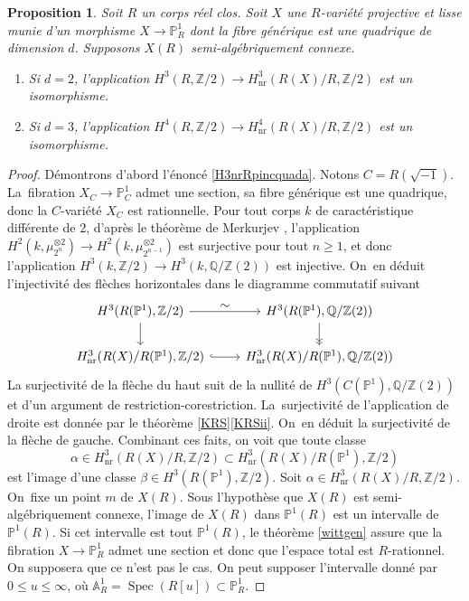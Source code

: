 \documentclass[JEP,XML,SOM,Unicode,francais,published]{cedram}
\let\ts\textstyle
\newenvironment{enumeratea}
{\bgroup\def\theenumi{\alph{enumi}}\begin{enumerate}}
{\end{enumerate}\egroup}
\newtheorem{prop}[thm]{Proposition}
\theoremstyle{definition}
\newcommand{\Q}{\mathbb Q}
\newcommand{\Z}{\mathbb Z}
\newcommand{\A}{\mathbb A}
\renewcommand{\P}{\mathbb P}
\newcommand{\Spec}{\operatorname{Spec}}
\newcommand{\on}[1]{\operatorname{#1}}
\begin{document}
\begin{prop}\label{H3nrRpincquad}
Soit $R$ un corps réel clos.
Soit $X$ une $R$-variété projective et lisse munie d'un
morphisme $X \to \P^1_{R}$ dont la fibre générique est une quadrique de dimension $d$. Supposons $X(R)$ semi-algébriquement connexe.
\begin{enumeratea}
\item\label{H3nrRpincquada}
Si $d=2$, l'application $H^3(R,\Z/2) \to H^3_{\on{nr}}(R(X)/R,\Z/2)$ est un isomorphisme.

\item\label{H3nrRpincquadb}
Si $d=3$, l'application
$H^4(R,\Z/2) \to H^4_{\on{nr}}(R(X)/R,\Z/2)$
est un isomorphisme.
\end{enumeratea}
\end{prop}

\begin{proof}
Démontrons d'abord l'énoncé \eqref{H3nrRpincquada}.
Notons $C=R(\sqrt{-1})$. La~fibration $X_{C} \to \P^1_{C}$ admet une section, sa fibre générique est une quadrique, donc la $C$-variété $X_{C}$ est rationnelle. Pour tout corps $k$ de caractéristique différente de $2$, d'après le théorème de Merkurjev \cite{merkurjev1981norm}, l'application $H^2(k,\mu_{2^n}^{\otimes 2})\to H^2(k,\mu_{2^{n-1}}^{\otimes 2})$ est surjective pour tout $n\geq 1$, et donc l'application $H^3(k,\Z/2) \to H^3(k,\Q/\Z(2))$ est injective. On~en déduit l'injectivité des flèches horizontales dans le diagramme commutatif suivant
\[
\begin{tikzcd}
H^3(R(\P^1),\Z/2) \arrow[r,"\ts \sim"] \arrow[d] & H^3(R(\P^1),\Q/\Z(2)) \arrow[d,->>] \\
H^3_{\on{nr}}(R(X)/R(\P^1),\Z/2) \arrow[r,hook] & H^3_{\on{nr}}(R(X)/R(\P^1),\Q/\Z(2))
\end{tikzcd}
\]
La surjectivité de la flèche du haut suit de la nullité de $H^3(C(\P^1),\Q/\Z(2))$ et d'un argument de restriction-corestriction. La~surjectivité de l'application de droite
est donnée par le théorème \ref{KRS}\eqref{KRSii}. On~en déduit la surjectivité de la flèche de gauche. Combinant ces faits, on voit que toute classe \[
\alpha \in
H^3_{\on{nr}}(R(X)/R,\Z/2) \subset H^3_{\on{nr}}(R(X)/R(\P^1),\Z/2)
\] est l'image d'une classe $\beta \in
H^3(R(\P^1), \Z/2)$.
Soit $\alpha \in H^3_{\on{nr}}(R(X)/R,\Z/2)$. On~fixe un point $m$ de $X(R)$. Sous l'hypothèse que $X(R)$ est semi-algébriquement connexe,
l'image de $X(R)$ dans $\P^1(R)$ est un intervalle de $\P^1(R)$.
Si cet intervalle est tout $\P^1(R)$, le théorème \ref{wittgen} assure que la fibration $X \to \P^1_{R}$ admet une section
et donc que l'espace total est $R$-rationnel. On
supposera que ce n'est pas le cas.
On peut supposer l'intervalle donné par $0 \leq u \leq \infty$,
où $\A^1_{R}=\Spec(R[u]) \subset \P^1_{R}$.


\end{proof}
\end{document}
